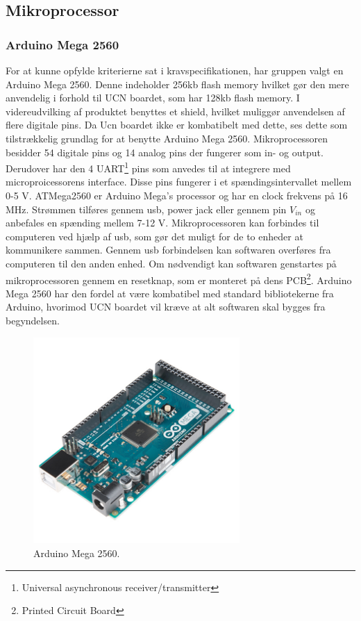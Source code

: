 \subsection{Mikroprocessor}
\subsubsection{Arduino Mega 2560}
For at kunne opfylde kriterierne sat i kravspecifikationen, har gruppen valgt en Arduino Mega 2560. Denne indeholder 256kb flash memory hvilket gør den mere anvendelig i forhold til UCN boardet, som har 128kb flash memory. I videreudvilking af produktet benyttes et shield, hvilket muliggør anvendelsen af flere digitale pins. Da Ucn boardet ikke er kombatibelt med dette, ses dette som tilstrækkelig grundlag for at benytte Arduino Mega 2560. 
\newline
Mikroprocessoren besidder 54 digitale pins og 14 analog pins der fungerer som in- og output. Derudover har den 4 UART\footnote{Universal asynchronous receiver/transmitter} pins som anvedes til at integrere med microproicessorens interface. \newline
Disse pins fungerer i et spændingsintervallet mellem 0-5 V. 
\newline
ATMega2560 er Arduino Mega's processor og har en clock frekvens på 16 MHz. Strømmen tilføres gennem usb, power jack eller gennem pin $V_{in}$ og anbefales en spænding mellem 7-12 V. 
\newline
Mikroprocessoren kan forbindes til computeren ved hjælp af usb, som gør det muligt for de to enheder at kommunikere sammen. Gennem usb forbindelsen kan softwaren overføres fra computeren til den anden enhed. Om nødvendigt kan softwaren genstartes på mikroprocessoren gennem en resetknap, som er monteret på dens PCB\footnote{Printed Circuit Board}.
\newline 
Arduino Mega 2560 har den fordel at være kombatibel med standard bibliotekerne fra Arduino, hvorimod UCN boardet vil kræve at alt softwaren skal bygges fra begyndelsen.

\begin{figure}[h!]
  \centering
  \includegraphics[width=0.7\textwidth]{figures/arduinoMega.jpg}
  \caption{Arduino Mega 2560.}
  \label{arduino2569}
\end{figure} 

\newpage



